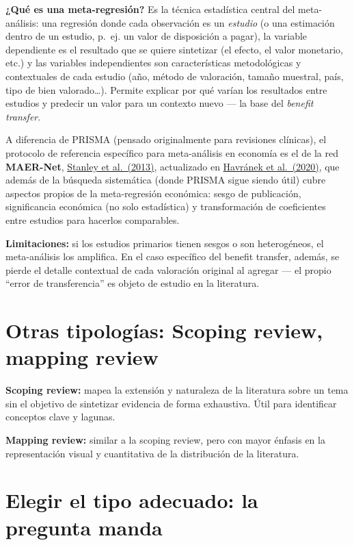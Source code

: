 \documentclass[
]{book}
\begin{document}
\textbf{¿Qué es una meta-regresión?} Es la técnica estadística central del meta-análisis: una regresión donde cada observación es un \emph{estudio} (o una estimación dentro de un estudio, p.~ej. un valor de disposición a pagar), la variable dependiente es el resultado que se quiere sintetizar (el efecto, el valor monetario, etc.) y las variables independientes son características metodológicas y contextuales de cada estudio (año, método de valoración, tamaño muestral, país, tipo de bien valorado\ldots). Permite explicar por qué varían los resultados entre estudios y predecir un valor para un contexto nuevo --- la base del \emph{benefit transfer}.

A diferencia de PRISMA (pensado originalmente para revisiones clínicas), el protocolo de referencia específico para meta-análisis en economía es el de la red \textbf{MAER-Net}, \href{https://doi.org/10.1111/joes.12008}{Stanley et al.~(2013)}, actualizado en \href{https://doi.org/10.1111/joes.12363}{Havránek et al.~(2020)}, que además de la búsqueda sistemática (donde PRISMA sigue siendo útil) cubre aspectos propios de la meta-regresión económica: sesgo de publicación, significancia económica (no solo estadística) y transformación de coeficientes entre estudios para hacerlos comparables.

\textbf{Limitaciones:} si los estudios primarios tienen sesgos o son heterogéneos, el meta-análisis los amplifica. En el caso específico del benefit transfer, además, se pierde el detalle contextual de cada valoración original al agregar --- el propio ``error de transferencia'' es objeto de estudio en la literatura.

\section{Otras tipologías: Scoping review, mapping review}\label{otras-tipologuxedas-scoping-review-mapping-review}

\textbf{Scoping review:} mapea la extensión y naturaleza de la literatura sobre un tema sin el objetivo de sintetizar evidencia de forma exhaustiva. Útil para identificar conceptos clave y lagunas.

\textbf{Mapping review:} similar a la scoping review, pero con mayor énfasis en la representación visual y cuantitativa de la distribución de la literatura.

\section{Elegir el tipo adecuado: la pregunta manda}\label{elegir-el-tipo-adecuado-la-pregunta-manda}
\end{document}
